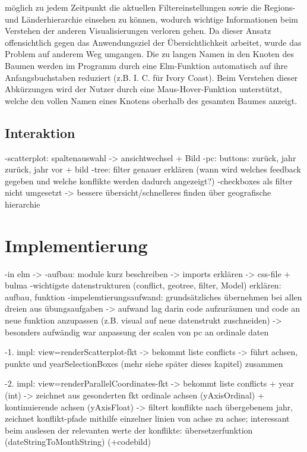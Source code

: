 \documentclass[usegeometry=true]{scrartcl}
\begin{document}
möglich zu jedem Zeitpunkt die aktuellen Filtereinstellungen sowie die Regions- und Länderhierarchie einsehen zu können, wodurch wichtige Informationen beim Verstehen der anderen Visualisierungen verloren gehen. Da dieser Ansatz offensichtlich gegen das Anwendungsziel der Übersichtlichkeit arbeitet, wurde das Problem auf anderem Weg umgangen. Die zu langen Namen in den Knoten des Baumen werden im Programm durch eine Elm-Funktion automatisch auf ihre Anfangsbuchstaben reduziert (z.B. \glqq I. C.\grqq{} für Ivory Coast). Beim Verstehen dieser Abkürzungen wird der Nutzer durch eine Maus-Hover-Funktion unterstützt, welche den vollen Namen eines Knotens oberhalb des gesamten Baumes anzeigt.\\

\subsection{Interaktion} \label{interaktion}

-scatterplot: spaltenauswahl -> ansichtwechsel + Bild
-pc: buttons: zurück, jahr zurück, jahr vor + bild
-tree: filter genauer erklären (wann wird welches feedback gegeben und welche konflikte werden dadurch angezeigt?)
-checkboxes als filter nicht umgesetzt -> bessere übersicht/schnelleres finden über geografische hierarchie

\section{Implementierung}

-in elm ->
-aufbau: module kurz beschreiben -> imports erklären -> css-file + bulma
-wichtigste datenstrukturen (conflict, geotree, filter, Model) erklären: aufbau, funktion
-impelemtierungsaufwand: grundsätzliches übernehmen bei allen dreien aus übungsaufgaben -> aufwand lag darin code aufzuräumen und code an neue funktion anzupassen (z.B. visual auf neue datenstrukt zuschneiden) -> besonders aufwändig war anpassung der scalen von pc an ordinale daten

-1. impl: view=renderScatterplot-fkt -> bekommt liste conflicts -> führt achsen, punkte und yearSelectionBoxes (mehr siehe später dieses kapitel) zusammen

-2. impl: view=renderParallelCoordinates-fkt -> bekommt liste conflicts + year (int) -> zeichnet aus gesonderten fkt ordinale achsen (yAxisOrdinal) + kontinuierende achsen (yAxisFloat) -> filtert konflikte nach übergebenem jahr, zeichnet konflikt-pfade mithilfe einzelner linien von achse zu achse; interessant beim auslesen der relevanten werte der konflikte: übersetzerfunktion (dateStringToMonthString) (+codebild)
\end{document}
